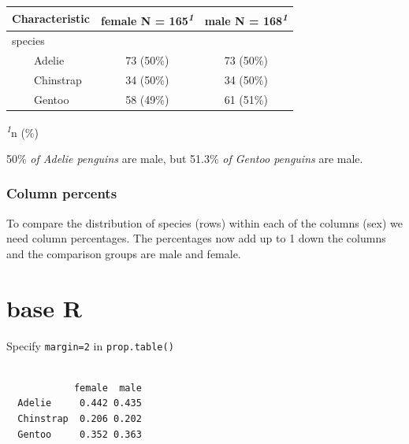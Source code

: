 \documentclass[
  letterpaper,
  DIV=11,
  numbers=noendperiod,
  oneside]{scrreprt}
\newenvironment{Shaded}{\begin{snugshade}}{\end{snugshade}}
\newcommand{\AttributeTok}[1]{\textcolor[rgb]{0.40,0.45,0.13}{#1}}
\newcommand{\DecValTok}[1]{\textcolor[rgb]{0.68,0.00,0.00}{#1}}
\newcommand{\FunctionTok}[1]{\textcolor[rgb]{0.28,0.35,0.67}{#1}}
\newcommand{\NormalTok}[1]{\textcolor[rgb]{0.00,0.23,0.31}{#1}}
\newcommand{\SpecialCharTok}[1]{\textcolor[rgb]{0.37,0.37,0.37}{#1}}
\begin{document}
\begin{table}
\fontsize{12.0pt}{14.4pt}\selectfont
\begin{tabular*}{\linewidth}{@{\extracolsep{\fill}}lcc}
\toprule
\textbf{Characteristic} & \textbf{female}  N = 165\textsuperscript{\textit{1}} & \textbf{male}  N = 168\textsuperscript{\textit{1}} \\ 
\midrule\addlinespace[2.5pt]
species &  &  \\ 
    Adelie & 73 (50\%) & 73 (50\%) \\ 
    Chinstrap & 34 (50\%) & 34 (50\%) \\ 
    Gentoo & 58 (49\%) & 61 (51\%) \\ 
\bottomrule
\end{tabular*}
\begin{minipage}{\linewidth}
\textsuperscript{\textit{1}}n (\%)\\
\end{minipage}
\end{table}

50\% \emph{of Adelie penguins} are male, but 51.3\% \emph{of Gentoo
penguins} are male.

\subsubsection{Column percents}\label{column-percents}

To compare the distribution of species (rows) within each of the columns
(sex) we need column percentages. The percentages now add up to 1 down
the columns and the comparison groups are male and female.

\section{base R}

Specify \texttt{margin=2} in \texttt{prop.table()}

\begin{Shaded}
\end{Shaded}

\begin{verbatim}
           
            female  male
  Adelie     0.442 0.435
  Chinstrap  0.206 0.202
  Gentoo     0.352 0.363
\end{verbatim}
\end{document}
